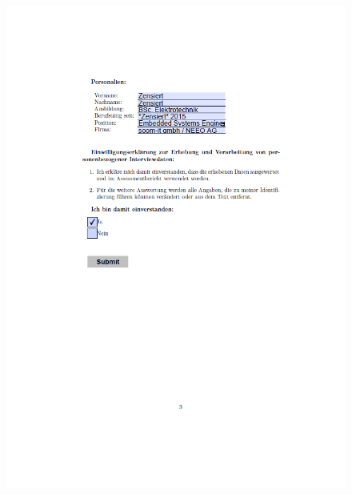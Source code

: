 \begin{figure}[ht]
	\centering
 	\includegraphics[width=1.3\textwidth]{images/Marco3.png}
 	\label{fig:fragmar3}
\end{figure}


